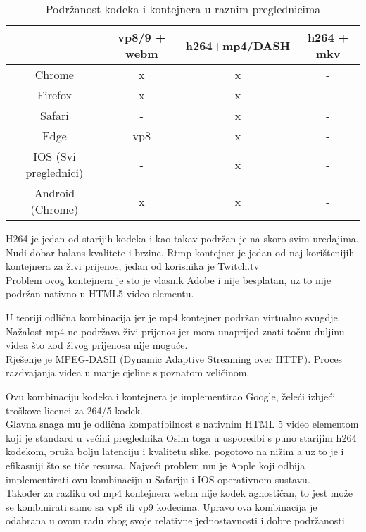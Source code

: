 \begin{center}
  \begin{table}[h]
    \begin{tabular}{|c|c|c|c|}
      \hline
      & vp8/9 + webm & h264+mp4/DASH & h264 + mkv \\
      \hline
      Chrome & x & x & - \\
      Firefox & x & x & - \\
      Safari & - & x & - \\
      Edge & vp8 & x & - \\
      IOS (Svi preglednici) & - & x & - \\
      Android (Chrome) & x & x & - \\
      \hline
    \end{tabular}
    \caption[Podržanost kodeka i kontejnera u raznim preglednicima]
    {Podržanost kodeka i kontejnera u raznim preglednicima \cite{appleCodec} \cite{androidCodec} \cite{canIUse}}
\end{table}

\end{center}

H264 je jedan od starijih kodeka i kao takav podržan je na skoro svim uređajima.
Nudi dobar balans kvalitete i brzine. \cite{h264Book}
\paraBreak
Rtmp kontejner je jedan od naj korištenijih kontejnera za živi prijenos, jedan od korisnika je Twitch.tv \\
Problem ovog kontejnera je sto je vlasnik Adobe i nije besplatan, uz to nije podržan nativno u HTML5 video elementu.

U teoriji odlična kombinacija jer je mp4 kontejner podržan virtualno svugdje.
\paraBreak
Nažalost mp4 ne podržava živi prijenos jer mora unaprijed znati točnu duljinu videa što kod živog prijenosa nije moguće. \\
Rješenje je MPEG-DASH (Dynamic Adaptive Streaming over HTTP). Proces razdvajanja videa u manje cjeline s poznatom veličinom.

Ovu kombinaciju kodeka i kontejnera je implementirao Google, želeći izbjeći troškove licenci za 264/5 kodek. \\
Glavna snaga mu je odlična kompatibilnost s nativnim HTML 5 video elementom koji je standard u većini preglednika \cite{ffmpegBook}
\paraBreak
Osim toga u usporedbi s puno starijim h264 kodekom, pruža bolju latenciju i kvalitetu slike, pogotovo 
na nižim \hyperref[sct:bitRate]{} a uz to je i efikasniji što se tiče resursa. \cite{ffmpegBook}
\paraBreak
Najveći problem mu je Apple koji odbija implementirati ovu kombinaciju u Safariju i IOS operativnom sustavu. \\
Također za razliku od mp4 kontejnera webm nije kodek agnostičan, to jest može se kombinirati samo sa vp8 ili vp9 kodecima. \cite{ffmpegBook}
\paraBreak
Upravo ova kombinacija je odabrana u ovom radu zbog svoje relativne jednostavnosti i dobre podržanosti.
